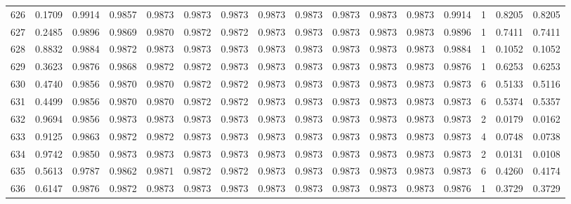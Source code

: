\begin{tabular}{lrrrrrrrrrrrrrrr}
626 &      0.1709 &  0.9914 &  0.9857 &  0.9873 &  0.9873 &  0.9873 &  0.9873 &  0.9873 &  0.9873 &  0.9873 &   0.9873 &     0.9914 &      1 &                    0.8205 &                     0.8205 \\
627 &      0.2485 &  0.9896 &  0.9869 &  0.9870 &  0.9872 &  0.9872 &  0.9873 &  0.9873 &  0.9873 &  0.9873 &   0.9873 &     0.9896 &      1 &                    0.7411 &                     0.7411 \\
628 &      0.8832 &  0.9884 &  0.9872 &  0.9873 &  0.9873 &  0.9873 &  0.9873 &  0.9873 &  0.9873 &  0.9873 &   0.9873 &     0.9884 &      1 &                    0.1052 &                     0.1052 \\
629 &      0.3623 &  0.9876 &  0.9868 &  0.9872 &  0.9872 &  0.9873 &  0.9873 &  0.9873 &  0.9873 &  0.9873 &   0.9873 &     0.9876 &      1 &                    0.6253 &                     0.6253 \\
630 &      0.4740 &  0.9856 &  0.9870 &  0.9870 &  0.9872 &  0.9872 &  0.9873 &  0.9873 &  0.9873 &  0.9873 &   0.9873 &     0.9873 &      6 &                    0.5133 &                     0.5116 \\
631 &      0.4499 &  0.9856 &  0.9870 &  0.9870 &  0.9872 &  0.9872 &  0.9873 &  0.9873 &  0.9873 &  0.9873 &   0.9873 &     0.9873 &      6 &                    0.5374 &                     0.5357 \\
632 &      0.9694 &  0.9856 &  0.9873 &  0.9873 &  0.9873 &  0.9873 &  0.9873 &  0.9873 &  0.9873 &  0.9873 &   0.9873 &     0.9873 &      2 &                    0.0179 &                     0.0162 \\
633 &      0.9125 &  0.9863 &  0.9872 &  0.9872 &  0.9873 &  0.9873 &  0.9873 &  0.9873 &  0.9873 &  0.9873 &   0.9873 &     0.9873 &      4 &                    0.0748 &                     0.0738 \\
634 &      0.9742 &  0.9850 &  0.9873 &  0.9873 &  0.9873 &  0.9873 &  0.9873 &  0.9873 &  0.9873 &  0.9873 &   0.9873 &     0.9873 &      2 &                    0.0131 &                     0.0108 \\
635 &      0.5613 &  0.9787 &  0.9862 &  0.9871 &  0.9872 &  0.9872 &  0.9873 &  0.9873 &  0.9873 &  0.9873 &   0.9873 &     0.9873 &      6 &                    0.4260 &                     0.4174 \\
636 &      0.6147 &  0.9876 &  0.9872 &  0.9873 &  0.9873 &  0.9873 &  0.9873 &  0.9873 &  0.9873 &  0.9873 &   0.9873 &     0.9876 &      1 &                    0.3729 &                     0.3729 \\

\end{tabular}
